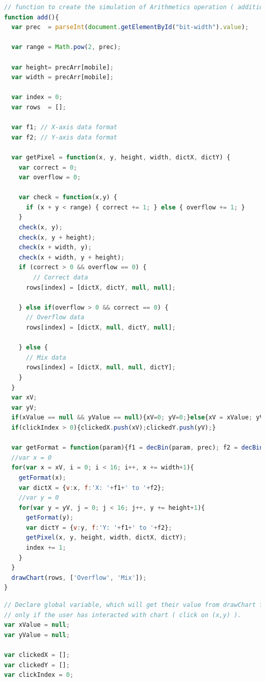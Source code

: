 \documentclass[11pt]{article}
\begin{document}
\begin{lstlisting}[label={lst:add}, language=Javascript, caption={add function},]
// function to create the simulation of Arithmetics operation ( addition )
function add(){
  var prec  = parseInt(document.getElementById("bit-width").value);

  var range = Math.pow(2, prec);

  var height= precArr[mobile];
  var width = precArr[mobile];

  var index = 0;
  var rows  = [];

  var f1; // X-axis data format 
  var f2; // Y-axis data format

  var getPixel = function(x, y, height, width, dictX, dictY) {
    var correct = 0;
    var overflow = 0;
    
    var check = function(x,y) {
      if (x + y < range) { correct += 1; } else { overflow += 1; }  
    }
    check(x, y);
    check(x, y + height);
    check(x + width, y);
    check(x + width, y + height);
    if (correct > 0 && overflow == 0) {
        // Correct data
      rows[index] = [dictX, dictY, null, null];

    } else if(overflow > 0 && correct == 0) {
      // Overflow data
      rows[index] = [dictX, null, dictY, null];

    } else {
      // Mix data
      rows[index] = [dictX, null, null, dictY];
    }
  }
  var xV;
  var yV; 
  if(xValue == null && yValue == null){xV=0; yV=0;}else{xV = xValue; yV = yValue;}
  if(clickIndex > 0){clickedX.push(xV);clickedY.push(yV);}
  
  var getFormat = function(param){f1 = decBin(param, prec); f2 = decBin(param+height, prec);}
  //var x = 0
  for(var x = xV, i = 0; i < 16; i++, x += width+1){
    getFormat(x);
    var dictX = {v:x, f:'X: '+f1+' to '+f2};
    //var y = 0
    for(var y = yV, j = 0; j < 16; j++, y += height+1){
      getFormat(y);
      var dictY = {v:y, f:'Y: '+f1+' to '+f2};
      getPixel(x, y, height, width, dictX, dictY);
      index += 1;
    }
  }
  drawChart(rows, ['Overflow', 'Mix']);
}
\end{lstlisting}

\begin{lstlisting}[label={lst:xyvalue-global}, language=Javascript, caption={Global variables},]
// Declare global variable, which will get their value from drawChart function, 
// only if the user has interacted with chart ( click on (x,y) ). 
var xValue = null;
var yValue = null;

var clickedX = [];
var clickedY = [];
var clickIndex = 0;
\end{lstlisting}
\end{document}
